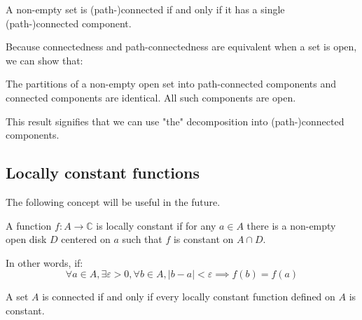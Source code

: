 \begin{thm*}
    A non-empty set is (path-)connected if and only if it has a single (path-)connected component.
\end{thm*}

Because connectedness and path-connectedness are equivalent when a set is open, we can show that:

\begin{thm*}
    The partitions of a non-empty open set into path-connected components and connected components are identical. All such components are open.
\end{thm*}

\begin{note}
    This result signifies that we can use "the" decomposition into (path-)connected components.
\end{note}

\subsection{Locally constant functions}
The following concept will be useful in the future.

\begin{defi}
    A function $f: A \rightarrow \mathbb{C}$ is locally constant if for any $a\in A$ there is a non-empty open disk $D$ centered on $a$ such that $f$ is constant on $A\cap D$.

    In other words, if:
    $$ \forall a \in A, \exists \varepsilon >0, \forall b \in A, |b-a|< \varepsilon \implies f(b) = f(a) $$
\end{defi}

\begin{thm*}
    A set $A$ is connected if and only if every locally constant function defined on $A$ is constant.
\end{thm*}

